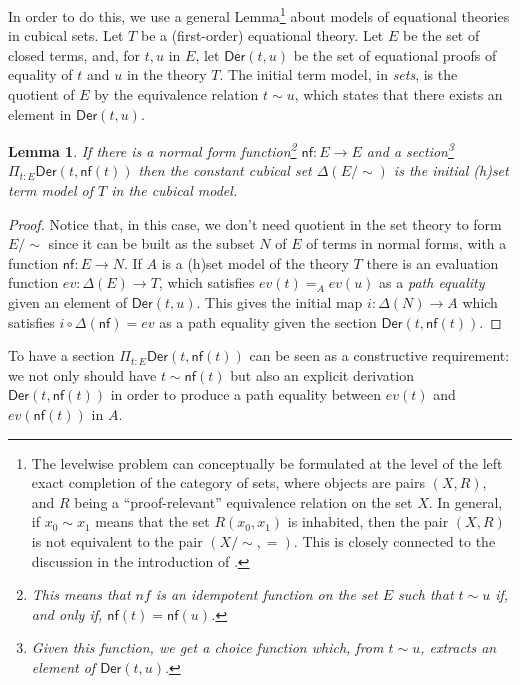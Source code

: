 \documentclass[10pt,a4paper]{article}
\newtheorem{lemma}[theorem]{Lemma}
\theoremstyle{definition}
\theoremstyle{remark}
\newcommand{\Der}{\mathsf{Der}}
\newcommand{\nf}{\mathsf{nf}}
\begin{document}
In order to do this, we use a general Lemma\footnote{The levelwise problem can conceptually be formulated at the level of the left exact
completion of the category of sets, where objects are pairs $(X,R)$, and $R$ being a ``proof-relevant'' equivalence relation on the set $X$.
In general, if $x_0\sim x_1$ means that the set $R(x_0,x_1)$ is inhabited, then the pair $(X,R)$ is not equivalent to the pair $(X/\sim,=)$.
This is closely connected to the discussion in the introduction of \cite{shulman21}.}
about models of equational theories in cubical sets. Let $T$
be a (first-order) equational theory. Let $E$ be the set of closed terms, and, for $t,u$ in $E$, let $\Der(t,u)$ be the set
of equational proofs of equality of $t$ and $u$ in the theory $T$. The initial term model, in {\em sets}, is the quotient of $E$
by the equivalence relation $t\sim u$, which states that there exists an element in $\Der(t,u)$.


\begin{lemma}\label{norm}
  If there is a normal form function\footnote{This means that $nf$ is an idempotent function on the set $E$ such that
  $t\sim u$ if, and only if, $\nf(t) = \nf(u)$.} $\nf:E\rightarrow E$ and a section\footnote{Given this function, we get a choice
  function which, from $t\sim u$, extracts an element of $\Der(t,u).$} $\Pi_{t:E}\Der(t,\nf(t))$ then the constant cubical
  set $\Delta(E/\sim)$ is the initial (h)set term model of $T$ in the cubical model.
\end{lemma}

\begin{proof}
Notice that, in this case, we don't need quotient
in the set theory to form $E/\sim$ since it can be built as the subset $N$ of $E$ of terms in normal forms, with a function
$\nf:E\rightarrow N$. If $A$ is a (h)set model of the theory $T$ there is an evaluation function $ev:\Delta(E)\rightarrow T$, which
satisfies $ev(t) =_A ev(u)$ as a {\em path equality} given an element of $\Der(t,u)$.
This gives the initial map $i:\Delta(N)\rightarrow A$ which satisfies $i\circ \Delta(\nf) = ev$ as a path equality given the section
$\Der(t,\nf(t))$.
\end{proof}

To have a section $\Pi_{t:E}\Der(t,\nf(t))$ can be seen as a constructive requirement: we not only should have $t\sim \nf(t)$ but also
an explicit derivation $\Der(t,\nf(t))$ in order to produce a path equality between $ev(t)$ and $ev(\nf(t))$ in $A$.
\end{document}
